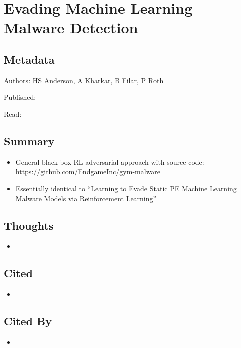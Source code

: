 \documentclass{article}
\begin{document}

\section*{Evading Machine Learning Malware Detection}

\subsection*{Metadata}

\noindent Authors: HS Anderson, A Kharkar, B Filar, P Roth

\noindent Published:

\noindent Read:

\subsection*{Summary}
\begin{itemize}
	\item General black box RL adversarial approach with source code: \url{https://github.com/EndgameInc/gym-malware}
	\item Essentially identical to ``Learning to Evade Static PE Machine Learning Malware Models via Reinforcement Learning''
\end{itemize}

\subsection*{Thoughts}
\begin{itemize}
	\item
\end{itemize}

\subsection*{Cited}
\begin{itemize}
	\item
\end{itemize}

\subsection*{Cited By}
\begin{itemize}
	\item
\end{itemize}
\end{document}

